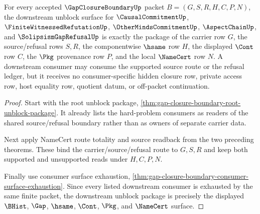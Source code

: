 \begin{theorem}
\label{thm:gap-closure-boundary-downstream-unblock-package}
For every accepted $\GapClosureBoundaryUp$ packet $B=(G,S,R,H,C,P,N)$, the downstream unblock surface for $\CausalCommitmentUp$, $\FiniteWitnessedRefutationUp$, $\OtherMindsCommitmentUp$, $\AspectChainUp$, and $\SolipsismGapRefusalUp$ is exactly the package of the carrier row $G$, the source/refusal rows $S,R$, the componentwise $\hsame$ row $H$, the displayed $\Cont$ row $C$, the $\Pkg$ provenance row $P$, and the local $\NameCert$ row $N$. A downstream consumer may consume the supported source route or the refusal ledger, but it receives no consumer-specific hidden closure row, private access row, host equality row, quotient datum, or off-packet continuation.
\end{theorem}
\begin{proof}
Start with the root unblock package, \autoref{thm:gap-closure-boundary-root-unblock-package}. It already lists the hard-problem consumers as readers of the shared source/refusal boundary rather than as owners of separate carrier data.

Next apply NameCert route totality and source readback from the two preceding theorems. These bind the carrier/source/refusal route to $G,S,R$ and keep both supported and unsupported reads under $H,C,P,N$.

Finally use consumer surface exhaustion, \autoref{thm:gap-closure-boundary-consumer-surface-exhaustion}. Since every listed downstream consumer is exhausted by the same finite packet, the downstream unblock package is precisely the displayed $\BHist$, $\Gap$, $\hsame$, $\Cont$, $\Pkg$, and $\NameCert$ surface.
\end{proof}
